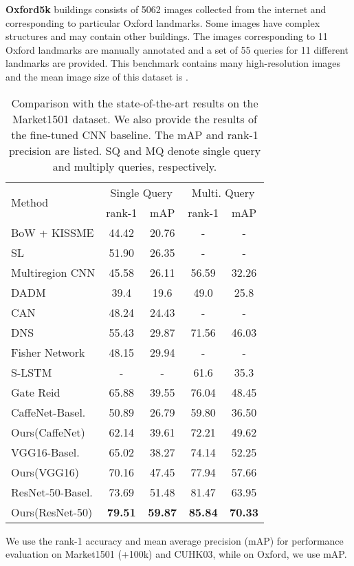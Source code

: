 \documentclass[journal]{IEEEtran}
\begin{document}
\textbf{Oxford5k} buildings \cite{philbin2007object} consists of 5062 images collected from the internet and corresponding to particular Oxford landmarks. Some images have complex structures and may contain other buildings. The images corresponding to 11 Oxford landmarks are manually annotated and a set of 55 queries for 11 different landmarks are provided. This benchmark contains many high-resolution images and the mean image size of this dataset is .  

\setlength{\tabcolsep}{6pt}
\begin{table}
\begin{center}
\begin{tabular}{l|cc|cc}
\hline
\multirow{2}{*}{Method} & \multicolumn{2}{c|}{Single Query} & \multicolumn{2}{c}{Multi. Query}\\
& rank-1 & mAP & rank-1  & mAP \\
\hline
BoW + KISSME \cite{zheng2015scalable} & 44.42& 20.76  & - & -\\
SL \cite{chen2016similarity} & 51.90& 26.35  & - & -\\
Multiregion CNN \cite{ustinova2015multiregion} & 45.58& 26.11 & 56.59 & 32.26 \\
DADM \cite{su2016deep} & 39.4 & 19.6 & 49.0 & 25.8 \\ 
CAN \cite{liu2016end} & 48.24 & 24.43 & - & -\\
DNS \cite{zhang2016learning} & 55.43 & 29.87 & 71.56 & 46.03 \\
Fisher Network \cite{wu2016deep} & 48.15 & 29.94 & - & -\\
S-LSTM \cite{varior2016siamese} & - & - & 61.6 & 35.3\\
Gate Reid \cite{varior2016gated} & 65.88 & 39.55 & 76.04 & 48.45 \\
\hline\hline
CaffeNet-Basel. \cite{krizhevsky2012imagenet} & 50.89 & 26.79 & 59.80 & 36.50 \\
Ours(CaffeNet) & 62.14 & 39.61  & 72.21 & 49.62\\
\hline
VGG16-Basel. \cite{simonyan2014very} & 65.02 & 38.27 & 74.14 & 52.25 \\
Ours(VGG16) & 70.16 & 47.45 & 77.94 & 57.66 \\
\hline
ResNet-50-Basel. \cite{he2016deep} & 73.69 & 51.48 & 81.47 & 63.95 \\
Ours(ResNet-50) & \textbf{79.51} & \textbf{59.87} & \textbf{85.84} & \textbf{70.33} \\
\hline
\end{tabular}
\end{center}
\caption{Comparison with the state-of-the-art results on the Market1501 dataset. We also provide the results of the fine-tuned CNN baseline. The mAP and rank-1 precision are listed. SQ and MQ denote single query and multiply queries, respectively.}
\label{table:mr}
\end{table}
We use the rank-1 accuracy and mean average precision (mAP) for performance evaluation on Market1501 (+100k) and CUHK03, while on Oxford, we use mAP. 
\end{document}
